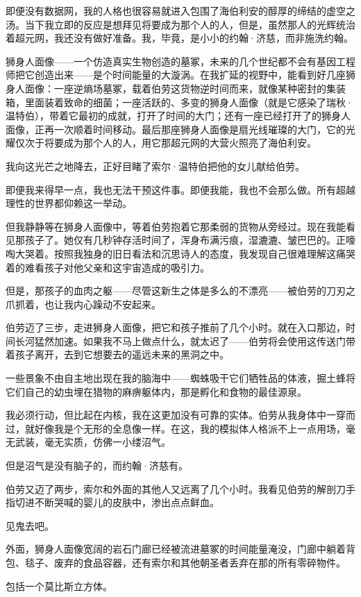 \documentclass[AutoFakeBold=true]{book}
\begin{document}
{\kaishu 即便没有数据网，我的人格也很容易就进入包围了海伯利安的醇厚的缔结的虚空之汤。当下我立即的反应是想拜见将要成为那个人的人，但是，虽然那人的光辉统治着超元网，我还没有做好准备。我，毕竟，是小小的约翰·济慈，而非施洗约翰。

狮身人面像——一个仿造真实生物创造的墓冢，未来的几个世纪都不会有基因工程师把它创造出来——是个时间能量的大漩涡。在我扩延的视野中，能看到好几座狮身人面像：一座逆熵场墓冢，载着伯劳这货物逆时间而来，就像某种密封的集装箱，里面装着致命的细菌；一座活跃的、多变的狮身人面像（就是它感染了瑞秋·温特伯），带着它最初的成就，打开了时间的大门；还有一座已经打开了的狮身人面像，正再一次顺着时间移动。最后那座狮身人面像是扇光线璀璨的大门，它的光耀仅次于将要成为那个人的人，用它那超元网的大营火照亮了海伯利安。

我向这光芒之地降去，正好目睹了索尔·温特伯把他的女儿献给伯劳。

即便我来得早一点，我也无法干预这件事。即便我能，我也不会那么做。所有超越理性的世界都仰赖这一举动。

但我静静等在狮身人面像中，等着伯劳抱着它那柔弱的货物从旁经过。现在我能看见那孩子了。她仅有几秒钟存活时间了，浑身布满污痕，湿漉漉、皱巴巴的。正嚎啕大哭着。按照我独身的旧日看法和沉思诗人的态度，我发现自己很难理解这痛哭着的难看孩子对他父亲和这宇宙造成的吸引力。

但是，那孩子的血肉之躯——尽管这新生之体是多么的不漂亮——被伯劳的刀刃之爪抓着，也让我内心躁动不安起来。

伯劳迈了三步，走进狮身人面像，把它和孩子推前了几个小时。就在入口那边，时间长河猛然加速。如果我不马上做点什么，就太迟了——伯劳将会使用这传送门带着孩子离开，去到它想要去的遥远未来的黑洞之中。

一些景象不由自主地出现在我的脑海中——蜘蛛吸干它们牺牲品的体液，掘土蜂将它们自己的幼虫埋在猎物的麻痹躯体内，那是孵化和食物的最佳源泉。

我必须行动，但比起在内核，我在这更加没有可靠的实体。伯劳从我身体中一穿而过，就好像我是个无形的全息像一样。在这，我的模拟体人格派不上一点用场，毫无武装，毫无实质，仿佛一小缕沼气。

但是沼气是没有脑子的，而约翰·济慈有。

伯劳又迈了两步，索尔和外面的其他人又远离了几个小时。我看见伯劳的解剖刀手指切进不断哭喊的婴儿的皮肤中，渗出点点鲜血。

见鬼去吧。

外面，狮身人面像宽阔的岩石门廊已经被流进墓冢的时间能量淹没，门廊中躺着背包、毯子、废弃的食品容器，还有索尔和其他朝圣者丢弃在那的所有零碎物件。

包括一个莫比斯立方体。

}
\end{document}
